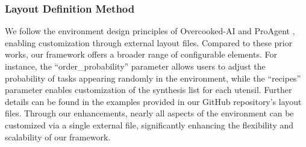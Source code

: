 \documentclass[11pt]{article}
\begin{document}
\begin{table}
  \centering
\caption{\label{appendix-collaborative-actions}
    The number of collaborative behaviors under different complexity levels is given, as well as the total number of corresponding collaborative actions.}
\end{table}



\subsubsection{Layout Definition Method}


We follow the environment design principles of Overcooked-AI \cite{carroll2019utility} and ProAgent \cite{zhang2024proagent}, enabling customization through external layout files. Compared to these prior works, our framework offers a broader range of configurable elements. For instance, the ``order\_probability'' parameter allows users to adjust the probability of tasks appearing randomly in the environment, while the ``recipes'' parameter enables customization of the synthesis list for each utensil. Further details can be found in the examples provided in our GitHub repository's layout files. Through our enhancements, nearly all aspects of the environment can be customized via a single external file, significantly enhancing the flexibility and scalability of our framework.
\end{document}
